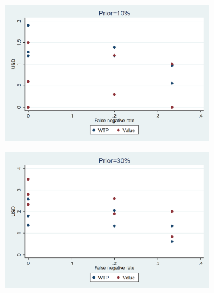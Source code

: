 \documentclass[11pt,a4paper]{article}
\begin{document}
\iffalse
\begin{figure}[!h]
\centering
\caption{Base rate fallacy for WTP: FN rate sensitivity by prior} \label{WTP_FN_coll}
\begin{subfigure}[t]{0.5\textwidth}
  \centering
  \includegraphics[width=.95\linewidth]{Graphs/hist_WTP_FN_coll1.png}
\end{subfigure}%
\begin{subfigure}[t]{0.5\textwidth}
  \centering
  \includegraphics[width=.95\linewidth]{Graphs/hist_WTP_FN_coll3.png}
\end{subfigure}



\end{figure}
\end{document}

